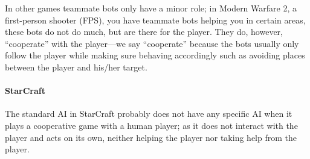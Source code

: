 In other games teammate bots only have a minor role; in Modern Warfare 2\cite{callofduty}, a
first-person shooter (FPS), you have teammate bots helping you in certain areas, these bots do not
do much, but are there for the player. They do, however, “cooperate” with the player—we say
“cooperate” because the bots usually only follow the player while making sure behaving accordingly
such as avoiding places between the player and his/her target.

\paragraph{StarCraft} The standard AI in StarCraft probably does not have any specific AI when it
plays a cooperative game with a human player; as it does not interact with the player and acts on
its own, neither helping the player nor taking help from the player. 
